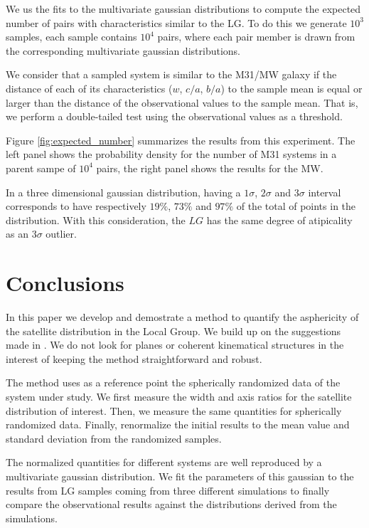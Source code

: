 \documentclass[a4paper,fleqn,usenatbib]{mnras}
\begin{document}
We us the fits to the multivariate gaussian distributions to
compute the expected number of pairs with characteristics similar to
the LG.
To do this we generate $10^3$ samples, each sample contains $10^4$
pairs, where each pair member is drawn from the corresponding
multivariate gaussian distributions.  

We consider that a sampled system is similar to the M31/MW galaxy if the
distance of each of its characteristics ($w$, $c/a$, $b/a$) to the
sample mean is equal or larger than the distance of the observational
values to the sample mean.   
That is, we perform a double-tailed test using the observational
values as a threshold. 

Figure \ref{fig:expected_number} summarizes the results from this
experiment. 
The left panel shows the probability density for the number of M31
systems in a parent sampe of $10^4$ pairs, the right panel shows the
results for the MW.



In a three dimensional gaussian distribution, having a $1\sigma$,
$2\sigma$ and $3\sigma$ interval corresponds to have respectively $19 \%$, $73 \%$ and
$97 \%$ of the total of points in the distribution.
With this consideration, the $LG$ has the same degree of atipicality
as an $3\sigma$ outlier.



\section{Conclusions}

In this paper we develop and demostrate a method to quantify the
asphericity of the satellite distribution in the Local Group.
We build up on the suggestions made in \cite{XX}.
We do not look for planes or coherent kinematical structures in the
interest of keeping the method straightforward and robust.

The method uses as a reference point the spherically randomized data
of the system under study.
We first measure the width and axis ratios for the satellite
distribution of interest. 
Then, we measure the same quantities for spherically
randomized data. 
Finally, renormalize the initial results to the mean value and
standard deviation from the randomized samples.  

The normalized quantities for different systems are well reproduced by
a multivariate gaussian distribution. 
We fit the parameters of this gaussian to the results from 
LG samples coming from three different simulations
to finally compare the observational results against the distributions
derived from the simulations.
\end{document}

